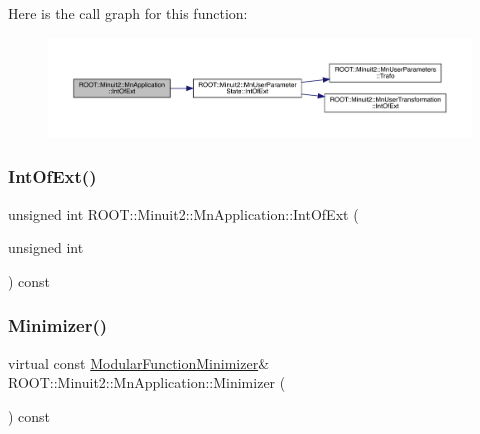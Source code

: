 Here is the call graph for this function\+:\nopagebreak
\begin{figure}[H]
\begin{center}
\leavevmode
\includegraphics[width=350pt]{df/dd5/classROOT_1_1Minuit2_1_1MnApplication_a7911389abce948da10dd82a8a172afd5_cgraph}
\end{center}
\end{figure}
\mbox{\label{classROOT_1_1Minuit2_1_1MnApplication_a7911389abce948da10dd82a8a172afd5}} 
\subsubsection{\texorpdfstring{IntOfExt()}{IntOfExt()}\hspace{0.1cm}{\footnotesize\ttfamily [2/2]}}
{\footnotesize\ttfamily unsigned int R\+O\+O\+T\+::\+Minuit2\+::\+Mn\+Application\+::\+Int\+Of\+Ext (\begin{DoxyParamCaption}\item[{unsigned int}]{ }\end{DoxyParamCaption}) const}

\mbox{\label{classROOT_1_1Minuit2_1_1MnApplication_a5a8e1e2658b731b5f4023dd1b1594223}} 
\subsubsection{\texorpdfstring{Minimizer()}{Minimizer()}\hspace{0.1cm}{\footnotesize\ttfamily [1/2]}}
{\footnotesize\ttfamily virtual const \mbox{\hyperlink{classROOT_1_1Minuit2_1_1ModularFunctionMinimizer}{Modular\+Function\+Minimizer}}\& R\+O\+O\+T\+::\+Minuit2\+::\+Mn\+Application\+::\+Minimizer (\begin{DoxyParamCaption}{ }\end{DoxyParamCaption}) const\hspace{0.3cm}{\ttfamily [pure virtual]}}



